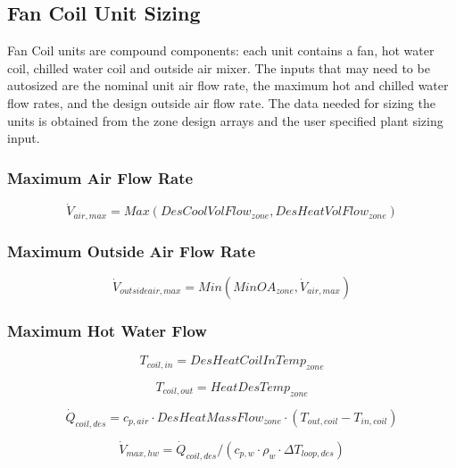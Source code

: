 \subsection{Fan Coil Unit Sizing}\label{fan-coil-unit-sizing}

Fan Coil units are compound components: each unit contains a fan, hot water coil, chilled water coil and outside air mixer. The inputs that may need to be autosized are the nominal unit air flow rate, the maximum hot and chilled water flow rates, and the design outside air flow rate. The data needed for sizing the units is obtained from the zone design arrays and the user specified plant sizing input.

\subsubsection{Maximum Air Flow Rate}\label{maximum-air-flow-rate}

\begin{equation}
\dot V_{air,max} = Max(DesCoolVolFlow_{zone},DesHeatVolFlow_{zone})
\end{equation}

\subsubsection{Maximum Outside Air Flow Rate}\label{maximum-outside-air-flow-rate}

\begin{equation}
\dot V_{outsideair,max} = Min(MinOA_{zone},\dot V_{air,max})
\end{equation}

\subsubsection{Maximum Hot Water Flow}\label{maximum-hot-water-flow}

\begin{equation}
T_{coil,in} = DesHeatCoilInTemp_{zone}
\end{equation}

\begin{equation}
T_{coil,out} = HeatDesTemp_{zone}
\end{equation}

\begin{equation}
\dot{Q}_{coil,des} = c_{p,air} \cdot DesHeatMassFlow_{zone} \cdot (T_{out,coil} - T_{in,coil})
\end{equation}

\begin{equation}
\dot{V}_{max,hw} = \dot{Q}_{coil,des} / (c_{p,w} \cdot \rho_{w} \cdot \Delta T_{loop,des})
\end{equation}

